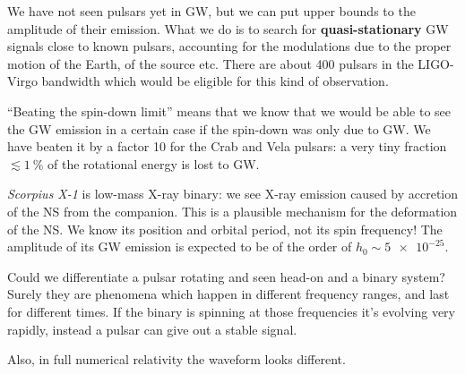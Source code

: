 \documentclass[main.tex]{subfiles}
\begin{document}
We have not seen pulsars yet in GW, but we can put upper bounds to the amplitude of their emission. 
What we do is to search for \textbf{quasi-stationary} GW signals close to known pulsars, accounting for the modulations due to the proper motion of the Earth, of the source etc.
There are about 400 pulsars in the LIGO-Virgo bandwidth which would be eligible for this kind of observation.

``Beating the spin-down limit'' means that we know that we would be able to see the GW emission in a certain case if the spin-down was only due to GW.
We have beaten it by a factor 10 for the Crab and Vela pulsars: a very tiny fraction \(\lesssim \SI{1}{\percent}\) of the rotational energy is lost to GW. 

\emph{Scorpius X-1} is low-mass X-ray binary: we see X-ray emission caused by accretion of the NS from the companion. 
This is a plausible mechanism for the deformation of the NS. 
We know its position and orbital period, not its spin frequency! 
The amplitude of its GW emission is expected to be of the order of \(h_0 \sim \num{5e-25}\).


Could we differentiate a pulsar rotating and seen head-on and a binary system? 
Surely they are phenomena which happen in different frequency ranges, and last for different times. 
If the binary is spinning at those frequencies it's evolving very rapidly, instead a pulsar can give out a stable signal. 

Also, in full numerical relativity the waveform looks different. 
\end{document}
